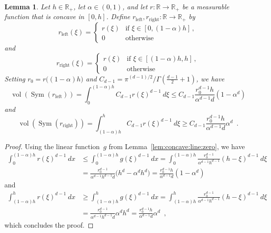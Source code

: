 \documentclass{article}
\newtheorem{lem}[thm]{Lemma}
\DeclareMathOperator{\vol}{vol}
\DeclareMathOperator{\Sym}{Sym}
\newcommand{\IR}{\mathbb{R}}
\renewcommand{\leq}{\leqslant}
\renewcommand{\geq}{\geqslant}
\begin{document}
\begin{lem}\label{lem:volumes}
Let $h\in\IR_+$, let $\alpha \in (0,1)$, and let $r:\IR \to \IR_+$ be a measurable function that is concave in $[0,h]$.
Define $r_\mathrm{left}, r_\mathrm{right}:\IR\to \IR_+$ by
$$r_\mathrm{left}(\xi) = \begin{cases}
  r(\xi) & \text{if } \xi \in [0,(1-\alpha)h]\,,\\
  0  & \text{otherwise}
\end{cases}$$
and
$$r_\mathrm{right}(\xi) = \begin{cases}
  r(\xi) & \text{if } \xi \in [(1-\alpha)h,h]\,,\\
  0  & \text{otherwise}
\end{cases}$$
Setting $r_0 = r\big((1-\alpha)h\big)$ and $C_{d-1} = \pi^{(d-1)/2}/\Gamma(\frac{d-1}{2}+1)$,
we have
\begin{equation}
\vol(\Sym(r_\mathrm{left})) = \int_0^{(1-\alpha)h} C_{d-1} r(\xi)^{d-1} \ d\xi
\leq
C_{d-1} \frac{r_0^{d-1}h}{\alpha^{d-1}d} (1 - \alpha^d)
\end{equation}
and
\begin{equation}
\vol(\Sym(r_\mathrm{right})) = \int_{(1-\alpha)h}^{h} C_{d-1} r(\xi)^{d-1} \ d\xi
\geq
C_{d-1}\frac{r_0^{d-1}h}{\alpha^{d-1}d} \alpha^d
\enspace.
\end{equation}
\end{lem}
\begin{proof}
Using the linear function~$g$ from Lemma~\ref{lem:concave:line:zero}, we have
\begin{equation}
\begin{split}
\int_0^{(1-\alpha)h} r(\xi)^{d-1} \ dx
& \leq
\int_0^{(1-\alpha)h} g(\xi)^{d-1} \ dx
=
\int_0^{(1-\alpha)h} \frac{r_0^{d-1}}{\alpha^{d-1}h^{d-1}} (h-\xi)^{d-1} \ d\xi
\\ & =
\frac{r_0^{d-1}}{\alpha^{d-1}h^{d-1}d} \big(h^d - \alpha^d h^d\big)
=
\frac{r_0^{d-1}h}{\alpha^{d-1}d} (1 - \alpha^d)
\end{split}
\end{equation}
and
\begin{equation}
\begin{split}
\int_{(1-\alpha)h}^h r(\xi)^{d-1} \ dx
& \geq
\int_{(1-\alpha)h}^h g(\xi)^{d-1} \ dx
=
\int_{(1-\alpha)h}^h \frac{r_0^{d-1}}{\alpha^{d-1}h^{d-1}} (h-\xi)^{d-1} \ d\xi
\\ & =
\frac{r_0^{d-1}}{\alpha^{d-1}h^{d-1}d} \alpha^d h^d
=
\frac{r_0^{d-1}h}{\alpha^{d-1}d} \alpha^d
\enspace,
\end{split}
\end{equation}
which concludes the proof.
\end{proof}
\end{document}
